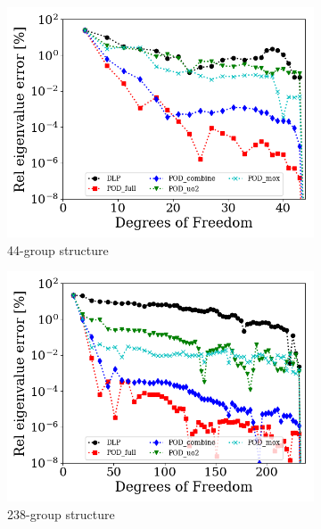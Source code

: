\documentclass[5p,times,twocolumn,10pt]{elsarticle}
\begin{document}
    \begin{figure}[!htbp]
        \centering
        \begin{subfigure}[b]{\columnwidth}
            \centering
            \includegraphics[scale=0.55]{figures/k_error_44}
            \caption{44-group structure}
            \label{fig:k44}
        \end{subfigure}
        \hfill
        \begin{subfigure}[b]{\columnwidth}
            \centering
            \includegraphics[scale=0.55]{figures/k_error_238}
            \caption{238-group structure}
            \label{fig:k238}
        \end{subfigure}
        \hfill
        \begin{subfigure}[b]{\columnwidth}

\end{subfigure}
\end{figure}
\end{document}
